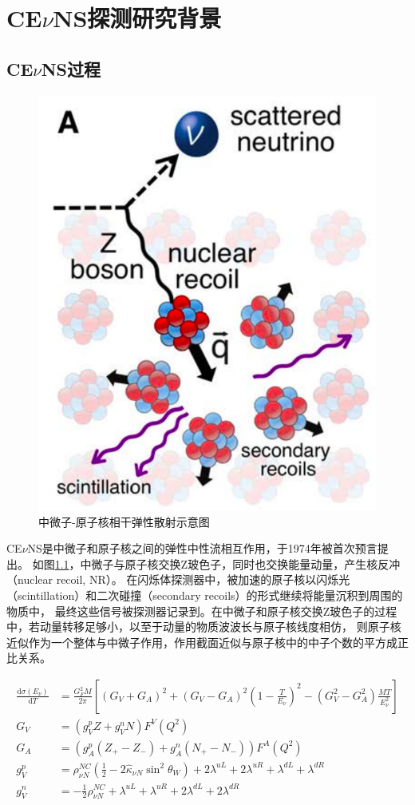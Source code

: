 
\chapter{CE$\nu$NS探测研究背景}

\section{CE$\nu$NS过程}

\begin{figure}
    \centering
    \includegraphics[width=0.4\linewidth]{figures/CEvNS_demo.png}
    \caption{\label{fig:cevns_demo} 中微子-原子核相干弹性散射示意图}
\end{figure}

CE$\nu$NS是中微子和原子核之间的弹性中性流相互作用，于1974年被首次预言提出\cite{freedman_coherent_1974,kopeliovich_isotopic_1974}。
如图\ref{fig:cevns_demo}，中微子与原子核交换Z玻色子，同时也交换能量动量，产生核反冲（nuclear recoil, NR）。
在闪烁体探测器中，被加速的原子核以闪烁光（scintillation）和二次碰撞（secondary recoils）的形式继续将能量沉积到周围的物质中，
最终这些信号被探测器记录到\cite{akimov_observation_2017}。在中微子和原子核交换Z玻色子的过程中，若动量转移足够小，以至于动量的物质波波长与原子核线度相仿，
则原子核近似作为一个整体与中微子作用，作用截面近似与原子核中的中子个数的平方成正比关系。

\begin{align}
    \label{eq:cevns}
    \frac{\mathrm{d}\sigma(E_\nu)}{\mathrm{d}T} &= \frac{G_F^2 M}{2\pi}\left[(G_V+G_A)^2+(G_V-G_A)^2(1-\frac{T}{E_{\nu}})^2-(G_V^2-G_A^2)\frac{MT}{E_{\nu}^2}\right] \\
    G_V &= (g_V^p Z+g_V^n N)F^V(Q^2) \\
    G_A &= (g_A^p(Z_{+}-Z_{-})+g_A^n(N_{+}-N_{-}))F^A(Q^2) \\
    \label{eq:cevns_theta}
    g_V^p &= \rho_{\nu N}^{NC}(\frac{1}{2} - 2\hat{\kappa}_{\nu N}\sin^2\theta_W) + 2\lambda^{uL} + 2\lambda^{uR} + \lambda^{dL} + \lambda^{dR} \\
    g_V^n &= -\frac{1}{2}\rho_{\nu N}^{NC} + \lambda^{uL} + \lambda^{uR} + 2\lambda^{dL} + 2\lambda^{dR}
\end{align}


